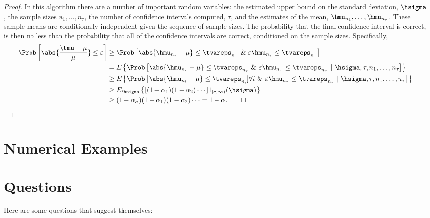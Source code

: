 \documentclass[graybox]{svmult}
\begin{document}
\begin{proof} In this algorithm there are a number of important random variables:  the estimated upper bound on the standard deviation, $\hsigma$, the sample sizes $n_1, \ldots, n_\tau$, the number of confidence intervals computed, $\tau$, and the estimates of the mean, $\hmu_{n_1}, \ldots, \hmu_{n_{\tau}}$. These sample means are conditionally independent given the sequence of sample sizes.  The probability that the final confidence interval is correct, is then no less than the probability that all of the confidence intervals are correct, conditioned on the sample sizes.  Specifically,
\begin{align*}
\Prob\left[\abs{\frac{\tmu-\mu}{\mu}} \le \varepsilon \right] & 
\ge \Prob\left[\abs{\hmu_{n_{\tau}}-\mu} \le \tvareps_{n_{\tau}} \ \& \ \varepsilon \hmu_{n_{\tau}} \le \tvareps_{n_{\tau}} \right] \\
& = E \left\{\Prob\left[\abs{\hmu_{n_{\tau}}-\mu} \le \tvareps_{n_{\tau}} \ \& \ \varepsilon \hmu_{n_{\tau}} \le \tvareps_{n_{\tau}} \ | \ \hsigma, \tau, n_1, \ldots, n_{\tau} \right] \right\} \\
& \ge E \left\{\Prob\left[\abs{\hmu_{n_{i}}-\mu} \le \tvareps_{n_{i}}] \forall i \ \& \ \varepsilon \hmu_{n_{\tau}} \le \tvareps_{n_{\tau}} \ | \ \hsigma, \tau, n_1, \ldots, n_{\tau} \right] \right\} \\
& \ge E_{\hsigma} \left\{[(1-\alpha_1)(1-\alpha_2) \cdots] 1_{[\sigma,\infty)}(\hsigma) \right\}\\
& \ge (1-\alpha_{\sigma}) (1-\alpha_1)(1-\alpha_2) \cdots = 1-\alpha. \qquad \qed
\end{align*}
\end{proof}


\section{Numerical Examples}


\section{Questions}

Here are some questions that suggest themselves:
\end{document}
